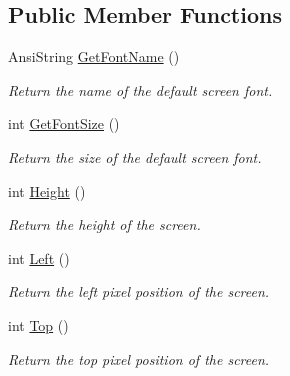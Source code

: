 \subsection*{Public Member Functions}
\begin{DoxyCompactItemize}
\item 
\mbox{\label{class_t_display_aea01e701e8480ffa268b0de85782db80}} 
Ansi\+String \mbox{\hyperlink{class_t_display_aea01e701e8480ffa268b0de85782db80}{Get\+Font\+Name}} ()
\begin{DoxyCompactList}\small\item\em Return the name of the default screen font. \end{DoxyCompactList}\item 
\mbox{\label{class_t_display_a664e19dbba876f346496ad4c6d13c0a3}} 
int \mbox{\hyperlink{class_t_display_a664e19dbba876f346496ad4c6d13c0a3}{Get\+Font\+Size}} ()
\begin{DoxyCompactList}\small\item\em Return the size of the default screen font. \end{DoxyCompactList}\item 
\mbox{\label{class_t_display_a5d3647a144c07e574430e7625e102ca9}} 
int \mbox{\hyperlink{class_t_display_a5d3647a144c07e574430e7625e102ca9}{Height}} ()
\begin{DoxyCompactList}\small\item\em Return the height of the screen. \end{DoxyCompactList}\item 
\mbox{\label{class_t_display_a1b2004c2d76614da605291b06863f340}} 
int \mbox{\hyperlink{class_t_display_a1b2004c2d76614da605291b06863f340}{Left}} ()
\begin{DoxyCompactList}\small\item\em Return the left pixel position of the screen. \end{DoxyCompactList}\item 
\mbox{\label{class_t_display_a7c843ab3083d7851ed199251d317f50a}} 
int \mbox{\hyperlink{class_t_display_a7c843ab3083d7851ed199251d317f50a}{Top}} ()
\begin{DoxyCompactList}\small\item\em Return the top pixel position of the screen. \end{DoxyCompactList}\item 

\end{DoxyCompactItemize}
